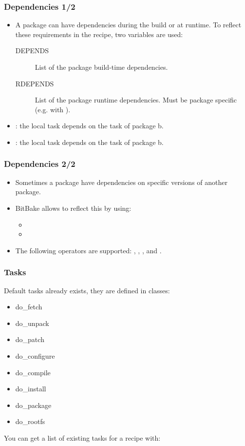 \begin{frame}
  \frametitle{Dependencies 1/2}
  \begin{itemize}
    \item A package can have dependencies during the build or at
          runtime. To reflect these requirements in the recipe, two
          variables are used:
    \begin{description}
      \item[DEPENDS] List of the package build-time dependencies.
      \item[RDEPENDS] List of the package runtime
        dependencies. Must be package specific (e.g. with
        ).
    \end{description}
    \item {}: the local 
      task depends on the  task of package
      b.
    \item {}: the local
       task depends on the
       task of package b.
  \end{itemize}
\end{frame}

\begin{frame}
  \frametitle{Dependencies 2/2}
  \begin{itemize}
    \item Sometimes a package have dependencies on specific versions
      of another package.
    \item BitBake allows to reflect this by using:
    \begin{itemize}
      \item {}
      \item {}
    \end{itemize}
    \item The following operators are supported: \code{=}, \code{>},
      \code{<}, \code{>=} and \code{<=}.
  \end{itemize}
\end{frame}

\begin{frame}[fragile]
  \frametitle{Tasks}
  Default tasks already exists, they are defined in classes:
  \begin{itemize}
    \item do\_fetch
    \item do\_unpack
    \item do\_patch
    \item do\_configure
    \item do\_compile
    \item do\_install
    \item do\_package
    \item do\_rootfs
  \end{itemize}
  You can get a list of existing tasks for a recipe with:
\end{frame}

